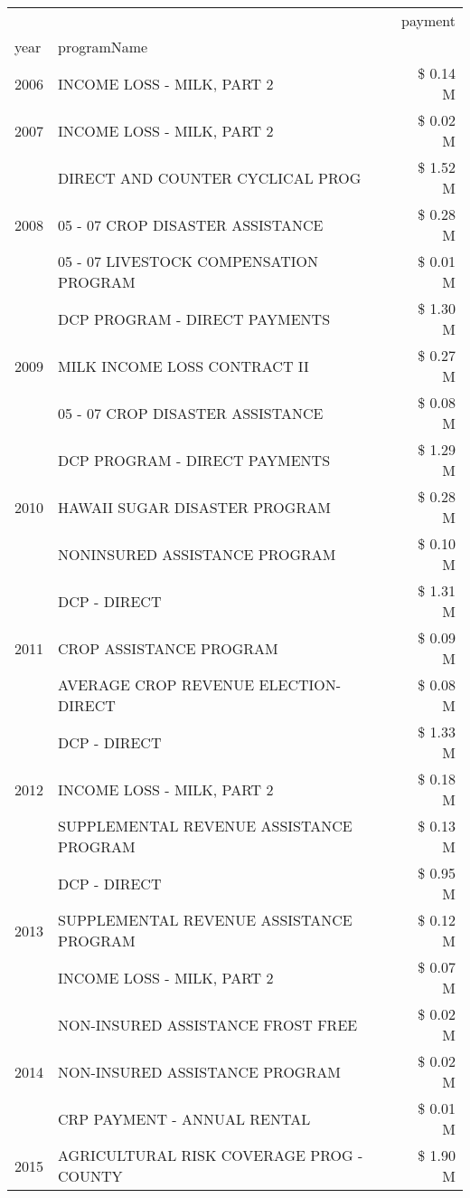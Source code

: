 \begin{tabular}{llr}
\toprule
 &  & payment \\
year & programName &  \\
\midrule
2006 & INCOME LOSS - MILK, PART 2 & \$ 0.14 M \\
\cline{1-3}
2007 & INCOME LOSS - MILK, PART 2 & \$ 0.02 M \\
\cline{1-3}
\multirow[t]{3}{*}{2008} & DIRECT AND COUNTER CYCLICAL PROG & \$ 1.52 M \\
 & 05 - 07 CROP DISASTER ASSISTANCE & \$ 0.28 M \\
 & 05 - 07 LIVESTOCK COMPENSATION PROGRAM & \$ 0.01 M \\
\cline{1-3}
\multirow[t]{3}{*}{2009} & DCP PROGRAM - DIRECT PAYMENTS & \$ 1.30 M \\
 & MILK INCOME LOSS CONTRACT II & \$ 0.27 M \\
 & 05 - 07 CROP DISASTER ASSISTANCE & \$ 0.08 M \\
\cline{1-3}
\multirow[t]{3}{*}{2010} & DCP PROGRAM - DIRECT PAYMENTS & \$ 1.29 M \\
 & HAWAII SUGAR DISASTER PROGRAM & \$ 0.28 M \\
 & NONINSURED ASSISTANCE PROGRAM & \$ 0.10 M \\
\cline{1-3}
\multirow[t]{3}{*}{2011} & DCP - DIRECT & \$ 1.31 M \\
 & CROP ASSISTANCE PROGRAM & \$ 0.09 M \\
 & AVERAGE CROP REVENUE ELECTION-DIRECT & \$ 0.08 M \\
\cline{1-3}
\multirow[t]{3}{*}{2012} & DCP - DIRECT & \$ 1.33 M \\
 & INCOME LOSS - MILK, PART 2 & \$ 0.18 M \\
 & SUPPLEMENTAL REVENUE ASSISTANCE PROGRAM & \$ 0.13 M \\
\cline{1-3}
\multirow[t]{3}{*}{2013} & DCP - DIRECT & \$ 0.95 M \\
 & SUPPLEMENTAL REVENUE ASSISTANCE PROGRAM & \$ 0.12 M \\
 & INCOME LOSS - MILK, PART 2 & \$ 0.07 M \\
\cline{1-3}
\multirow[t]{3}{*}{2014} & NON-INSURED ASSISTANCE FROST FREE & \$ 0.02 M \\
 & NON-INSURED ASSISTANCE PROGRAM & \$ 0.02 M \\
 & CRP PAYMENT - ANNUAL RENTAL & \$ 0.01 M \\
\cline{1-3}
\multirow[t]{3}{*}{2015} & AGRICULTURAL RISK COVERAGE PROG - COUNTY & \$ 1.90 M \\

\end{tabular}
